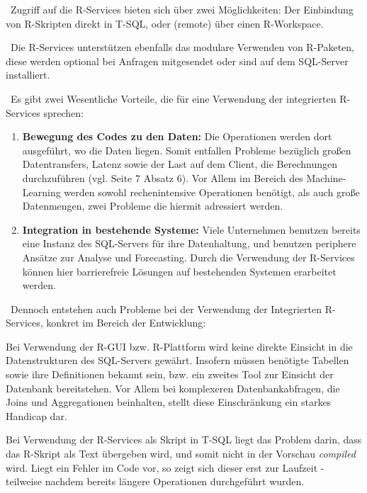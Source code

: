 ~\newline Zugriff auf die R-Services bieten sich über zwei Möglichkeiten: Der Einbindung von R-Skripten direkt in T-SQL, oder (remote) über einen R-Workspace. 

~\newline Die R-Services unterstützen ebenfalls das modulare Verwenden von R-Paketen, diese werden optional bei Anfragen mitgesendet oder sind auf dem SQL-Server installiert. 

~\newline Es gibt zwei Wesentliche Vorteile, die für eine Verwendung der integrierten R-Services sprechen:

\begin{enumerate}
	\item \textbf{Bewegung des Codes zu den Daten:} Die Operationen werden dort ausgeführt, wo die Daten liegen. Somit entfallen Probleme bezüglich großen Datentransfers, Latenz sowie der Last auf dem Client, die Berechnungen durchzuführen (vgl. \cite{SQLData} Seite 7 Absatz 6). Vor Allem im Bereich des Machine-Learning werden sowohl rechenintensive Operationen benötigt, als auch große Datenmengen, zwei Probleme die hiermit adressiert werden. 
	\item \textbf{Integration in bestehende Systeme:} Viele Unternehmen benutzen bereits eine Instanz des SQL-Servers für ihre Datenhaltung, und benutzen periphere Ansätze zur Analyse und Forecasting. Durch die Verwendung der R-Services können hier barrierefreie Lösungen auf bestehenden Systemen erarbeitet werden. 
\end{enumerate}

~\newline Dennoch entstehen auch Probleme bei der Verwendung der Integrierten R-Services, konkret im Bereich der Entwicklung: 

Bei Verwendung der R-GUI bzw. R-Plattform wird keine direkte Einsicht in die Datenstrukturen des SQL-Servers gewährt. Insofern müssen benötigte Tabellen sowie ihre Definitionen bekannt sein, bzw. ein zweites Tool zur Einsicht der Datenbank bereitstehen. Vor Allem bei komplexeren Datenbankabfragen, die Joins und Aggregationen beinhalten, stellt diese Einschränkung ein starkes Handicap dar. 

Bei Verwendung der R-Services als Skript in T-SQL liegt das Problem darin, dass das R-Skript als Text übergeben wird, und somit nicht in der Vorschau \textit{compiled} wird. Liegt ein Fehler im Code vor, so zeigt sich dieser erst zur Laufzeit - teilweise nachdem bereits längere Operationen durchgeführt wurden. 

